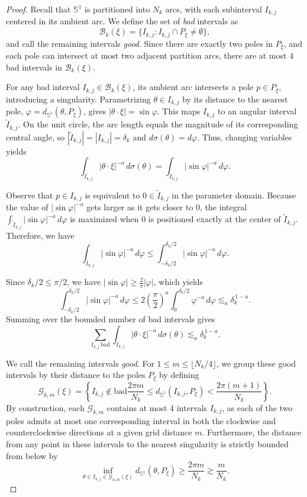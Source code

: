 \documentclass[11pt]{amsart}
\begin{document}
\begin{proof}
	Recall that $\mathbb{S}^1$ is partitioned into $N_k$ arcs, with each subinterval $I_{k,j}$ centered in its ambient arc. We define the set of \emph{bad} intervals as
	$$ \mathcal{B}_k(\xi) = \{ I_{k,j}:I_{k,j} \cap P_\xi \neq \emptyset \}, $$
	and call the remaining intervals \emph{good}. Since there are exactly two poles in $P_\xi$, and each pole can intersect at most two adjacent partition arcs, there are at most $4$ bad intervals in $\mathcal{B}_k(\xi)$.
	
	For any bad interval $I_{k,j} \in \mathcal{B}_k(\xi)$, its ambient arc intersects a pole $p \in P_\xi$, introducing a singularity. Parametrizing $\theta \in I_{k,j}$ by its distance to the nearest pole, $\varphi = d_{\mathbb{S}^1}(\theta, P_\xi)$, gives $|\theta \cdot \xi| = \sin \varphi$. This maps $I_{k,j}$ to an angular interval $\widetilde{I}_{k,j}$. On the unit circle, the arc length equals the magnitude of its corresponding central angle, so $|\widetilde{I}_{k,j}| = |I_{k,j}| = \delta_k$ and $d\sigma(\theta) = d\varphi$. Thus, changing variables yields
	$$ \int_{I_{k,j}} |\theta \cdot \xi|^{-a} \, d\sigma(\theta) = \int_{\widetilde{I}_{k,j}} |\sin \varphi|^{-a} \, d\varphi. $$
	
	Observe that $p \in I_{k,j}$ is equivalent to $0 \in \widetilde{I}_{k,j}$ in the parameter domain. Because the value of $|\sin \varphi|^{-a}$ gets larger as it gets closer to $0$, the integral $\int_{\widetilde{I}_{k,j}} |\sin \varphi|^{-a} \, d\varphi$ is maximized when $0$ is positioned exactly at the center of $\widetilde{I}_{k,j}$. Therefore, we have
	$$\int_{\widetilde{I}_{k,j}} |\sin \varphi|^{-a} \, d\varphi \le \int_{-\delta_k/2}^{\delta_k/2} |\sin \varphi|^{-a} \, d\varphi.$$
	
	Since $\delta_k/2 \le \pi/2$, we have $|\sin \varphi| \ge \frac{2}{\pi} |\varphi|$, which yields
	$$ \int_{-\delta_k/2}^{\delta_k/2} |\sin \varphi|^{-a} \, d\varphi \le 2 \left(\frac{\pi}{2}\right)^a \int_0^{\delta_k/2} \varphi^{-a} \, d\varphi \lesssim_a \delta_k^{\,1-a}. $$
	Summing over the bounded number of bad intervals gives
	$$ \sum_{I_{k,j} \, \text{bad}} \int_{I_{k,j}} |\theta \cdot \xi|^{-a} \, d\sigma(\theta) \lesssim_a \delta_k^{\,1-a}.$$
	
	We call the remaining intervals \emph{good}. For $1 \le m \le \lfloor N_k/4 \rfloor$, we group these good intervals by their distance to the poles $P_\xi$ by defining
	$$ \mathcal{G}_{k,m}(\xi) = \left\{ I_{k,j} \notin \text{bad}  \frac{2\pi m}{N_k} \le d_{\mathbb{S}^1}(I_{k,j}, P_\xi) < \frac{2\pi (m+1)}{N_k} \right\}. $$
	By construction, each $\mathcal{G}_{k,m}$ contains at most 4 intervals $I_{k,j}$, as each of the two poles admits at most one corresponding interval in both the clockwise and counterclockwise directions at a given grid distance $m$. Furthermore, the distance from any point in these intervals to the nearest singularity is strictly bounded from below by
	$$ \inf_{\theta \in I_{k,j} \in \mathcal{G}_{k,m}(\xi)} d_{\mathbb{S}^1}(\theta, P_\xi) \ge \frac{2\pi m}{N_k} \gtrsim \frac{m}{N_k}. $$
	

\end{proof}
\end{document}
